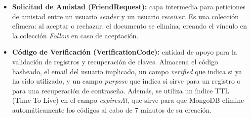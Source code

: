 \begin{itemize}
\item \textbf{Solicitud de Amistad (FriendRequest):} capa intermedia para peticiones de amistad entre un usuario \textit{sender} y un usuario \textit{receiver}. Es una colección efímera: al aceptar o rechazar, el documento se elimina, creando el vínculo en la colección \textit{Follow} en caso de aceptación.

\item \textbf{Código de Verificación (VerificationCode):} entidad de apoyo para la validación de registros y recuperación de claves. Almacena el código hasheado, el email del usuario implicado, un campo \textit{verified} que indica si ya ha sido utilizado, y un campo \textit{purpose} que indica si sirve para un registro o para una recuperación de contraseña. Además, se utiliza un índice TTL (Time To Live) en el campo \textit{expiresAt}, que sirve para que MongoDB elimine automáticamente los códigos al cabo de 7 minutos de su creación.

\end{itemize}